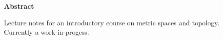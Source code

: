 
\clearpage
{}
{}
\begin{adjustwidth}{0.1\textwidth}{0.1\textwidth}
\begingroup
\null\vspace{0.2\textheight}
\begin{center}
{\bfseries\Large Abstract}\par\vspace{2em}

Lecture notes for an introductory course on metric spaces and topology. Currently a work-in-progess.
\end{center}
\endgroup
\end{adjustwidth}
\clearpage